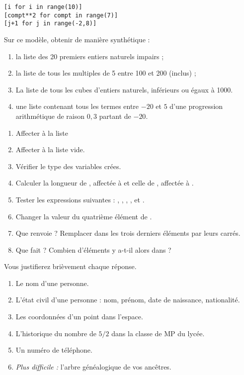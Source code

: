 \begin{lstlisting}
[i for i in range(10)]
[compt**2 for compt in range(7)]
[j+1 for j in range(-2,8)]
\end{lstlisting}
Sur ce modèle, obtenir de manière synthétique : 
\begin{enumerate}[label=\emph{\alph*)}]
  \item la liste des 20 premiers entiers naturels impairs ;
  \item la liste de tous les multiples de 5 entre 100 et 200 (inclus) ;
  \item La liste de tous les cubes d'entiers naturels, inférieurs ou égaux à 1000. 
  \item une liste contenant tous les termes entre $-20$ et $5$ d'une progression arithmétique de raison $0,3$ partant de $-20$.
\end{enumerate}

\question{}
\begin{enumerate}[label = \emph{\alph*)}]
  \item Affecter à  la liste \pyv{[2,5,3,-1,7,2,1]}
  \item Affecter à  la liste vide.
  \item Vérifier le type des variables crées.
  \item Calculer la longueur de , affectée à  et celle de , affectée à .
  \item Tester les expressions suivantes : , , , ,  et .
  \item Changer la valeur du quatrième élément de .
  \item Que renvoie  ? Remplacer dans  les trois derniers éléments par leurs carrés.
  \item Que fait  ? Combien d'éléments y a-t-il alors dans  ?
\end{enumerate}


Vous justifierez brièvement chaque réponse. 

\begin{enumerate}[label = \emph{\alph*)}]
  \item Le nom d'une personne.
  \item L'état civil d'une personne : nom, prénom, date de naissance, nationalité.
  \item Les coordonnées d'un point dans l'espace.
  \item L'historique du nombre de $5/2$ dans la classe de MP du lycée. 
  \item Un numéro de téléphone. 
  \item \emph{Plus difficile :} l'arbre généalogique de vos ancêtres. 
\end{enumerate}